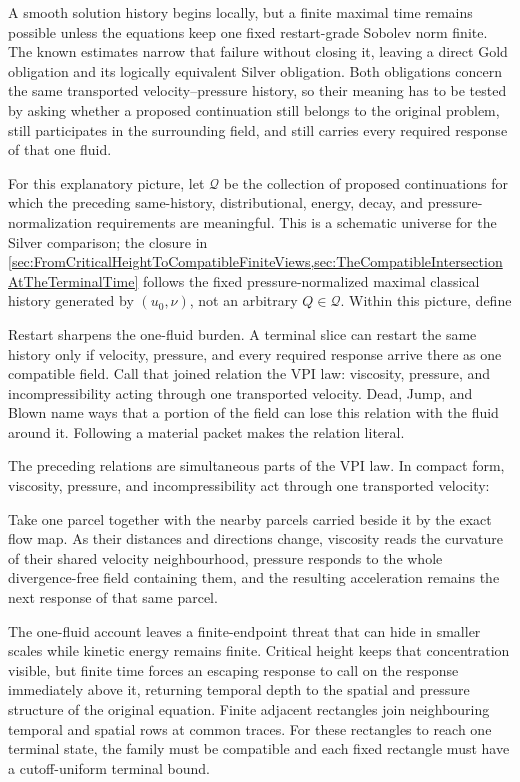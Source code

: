 A smooth solution history begins locally, but a finite maximal time remains possible unless the equations keep one fixed restart-grade Sobolev norm finite.
The known estimates narrow that failure without closing it, leaving a direct Gold obligation and its logically equivalent Silver obligation.
Both obligations concern the same transported velocity--pressure history, so their meaning has to be tested by asking whether a proposed continuation still belongs to the original problem, still participates in the surrounding field, and still carries every required response of that one fluid.

For this explanatory picture, let \(\mathcal Q\) be the collection of proposed continuations for which the preceding same-history, distributional, energy, decay, and pressure-normalization requirements are meaningful.
This is a schematic universe for the Silver comparison; the closure in \cref{sec:FromCriticalHeightToCompatibleFiniteViews,sec:TheCompatibleIntersectionAtTheTerminalTime} follows the fixed pressure-normalized maximal classical history generated by \((u_0,\nu)\), not an arbitrary \(Q\in\mathcal Q\).
Within this picture, define

Restart sharpens the one-fluid burden.
A terminal slice can restart the same history only if velocity, pressure, and every required response arrive there as one compatible field.
Call that joined relation the VPI law: viscosity, pressure, and incompressibility acting through one transported velocity.
Dead, Jump, and Blown name ways that a portion of the field can lose this relation with the fluid around it.
Following a material packet makes the relation literal.

The preceding relations are simultaneous parts of the VPI law.
In compact form, viscosity, pressure, and incompressibility act through one transported velocity:

Take one parcel together with the nearby parcels carried beside it by the exact flow map.
As their distances and directions change, viscosity reads the curvature of their shared velocity neighbourhood, pressure responds to the whole divergence-free field containing them, and the resulting acceleration remains the next response of that same parcel.

The one-fluid account leaves a finite-endpoint threat that can hide in smaller scales while kinetic energy remains finite.
Critical height keeps that concentration visible, but finite time forces an escaping response to call on the response immediately above it, returning temporal depth to the spatial and pressure structure of the original equation.
Finite adjacent rectangles join neighbouring temporal and spatial rows at common traces.
For these rectangles to reach one terminal state, the family must be compatible and each fixed rectangle must have a cutoff-uniform terminal bound.

